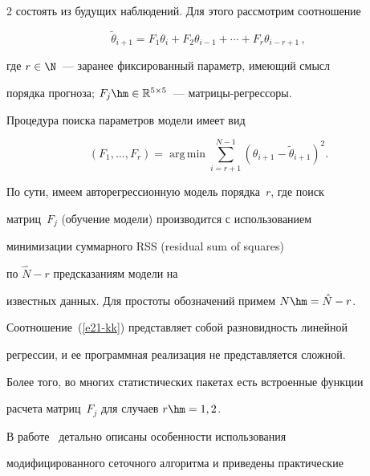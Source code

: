 \begin{multicols}{2}
состоять из будущих наблюдений. Для этого рассмотрим соотношение


$$


\tilde \theta_{i+1} = F_1  \theta_i +  F_2  \theta_{i-1} + \cdots +


F_r \theta_{i-r+1}\,,


$$


где $r\in\N$~--- заранее фиксированный параметр, имеющий смысл


порядка прогноза; $F_j \hm\in \mathbb{R}^{5 \times 5}$~--- мат\-ри\-цы-рег\-рес\-соры.





Процедура поиска параметров модели имеет вид


\begin{equation}


(F_1, \ldots, F_r) = \mathop{\mathrm{arg\,min}} \sum\limits_{i=r+1}^{N-1}\left(


\theta_{i+1}- \tilde \theta_{i+1} \right)^2\!.\! \label{e21-kk}


\end{equation}





По сути, имеем авторегрессионную модель порядка~$r$, где поиск


матриц~$F_j$ (обучение модели) производится с использованием


минимизации суммарного RSS (residual sum of squares)


по $\hat N-r$ предсказаниям модели на


известных данных. Для простоты обозначений примем $N \hm= \hat N - r$.





Соотношение~(\ref{e21-kk}) представляет собой разновидность линейной


регрессии, и ее программная реализация не представляется сложной.


Более того, во многих статистических пакетах есть встроенные функции


расчета матриц~$F_j$ для случаев $r\hm=1, 2$.








В работе~\cite{kya2015} детально описаны особенности использования


модифицированного сеточного алгоритма и приведены практические



\end{multicols}
